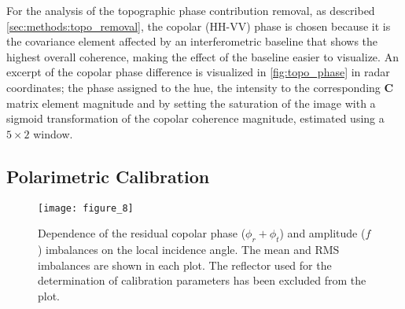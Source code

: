 For the analysis of the topographic phase contribution removal, as described \autoref{sec:methods:topo_removal}, the copolar (HH-VV) phase is chosen because it is the covariance element affected by an interferometric baseline that shows the highest overall coherence, making the effect of the baseline easier to visualize. An excerpt of the copolar phase difference is visualized in  \autoref{fig:topo_phase} in radar coordinates; the phase assigned to the hue, the intensity to the corresponding $\mathbf{C}$ matrix element magnitude and by setting the saturation of the image with a sigmoid transformation of the copolar coherence magnitude, estimated using a $\mathrm{5 \times 2}$ window.\\ 

\subsection{Polarimetric Calibration}\label{sec:results:proc_polcal}

\begin{figure}[Ht!]
	\centering
	\texttt{[image: figure\_8]}
	\caption{Dependence of the residual copolar phase ($\phi_r + \phi_t$) and amplitude  ($f$) imbalances on the local incidence angle. The mean and RMS imbalances are shown in each plot. The reflector used for the determination of calibration parameters has been excluded from the plot.}
	\label{fig:inc_angle_trend}
\end{figure}
				
